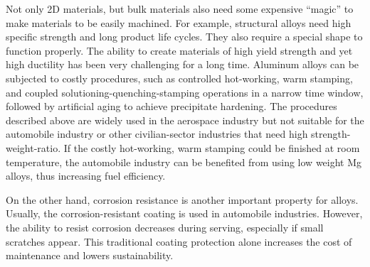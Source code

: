 Not only 2D materials, but bulk materials also need some expensive ``magic'' to make materials to be easily machined. For example, structural alloys need high specific strength and long product life cycles. They also require a special shape to function properly. The ability to create materials of high yield strength and yet high ductility has been very challenging for a long time. Aluminum alloys can be subjected to costly procedures, such as controlled hot-working, warm stamping, and coupled solutioning-quenching-stamping operations in a narrow time window, followed by artificial aging to achieve precipitate hardening. The procedures described above are widely used in the aerospace industry but not suitable for the automobile industry or other civilian-sector industries that need high strength-weight-ratio. If the costly hot-working, warm stamping could be finished at room temperature, the automobile industry can be benefited from using low weight Mg alloys, thus increasing fuel efficiency.

On the other hand, corrosion resistance is another important property for alloys. Usually, the corrosion-resistant coating is used in automobile industries. However, the ability to resist corrosion decreases during serving, especially if small scratches appear. This traditional coating protection alone increases the cost of maintenance and lowers sustainability.